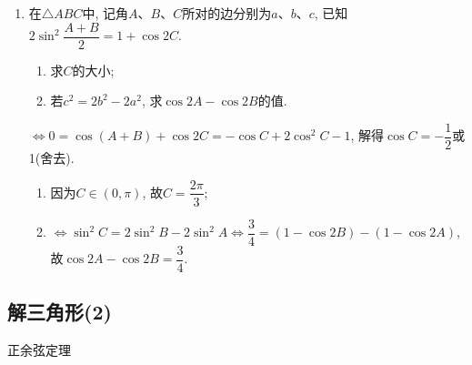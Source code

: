 \begin{enumerate}
\item 在$\triangle{ABC}$中, 记角$A$、$B$、$C$所对的边分别为$a$、$b$、$c$, 已知$2\sin^2\dfrac{A+B}{2}=1+\cos2C$. 
\begin{enumerate}
\item 求$C$的大小; 
\item 若$c^2=2b^2-2a^2$, 求$\cos2A-\cos2B$的值. 
\end{enumerate}
\begin{jieda}
$\iff 0=\cos(A+B)+\cos2C=-\cos{C}+2\cos^2C-1$, 解得$\cos{C}=-\dfrac{1}{2}$或1(舍去). 
\begin{enumerate}
\item 因为$C\in(0,\pi)$, 故$C=\dfrac{2\pi}{3}$; 
\item $\iff \sin^2C=2\sin^2B-2\sin^2A\iff \dfrac{3}{4}=(1-\cos2B)-(1-\cos2A)$, \\
故$\cos2A-\cos2B=\dfrac{3}{4}$. 
\end{enumerate}
\end{jieda}

\end{enumerate}



\subsection{解三角形(2)}
\zsd 正余弦定理

